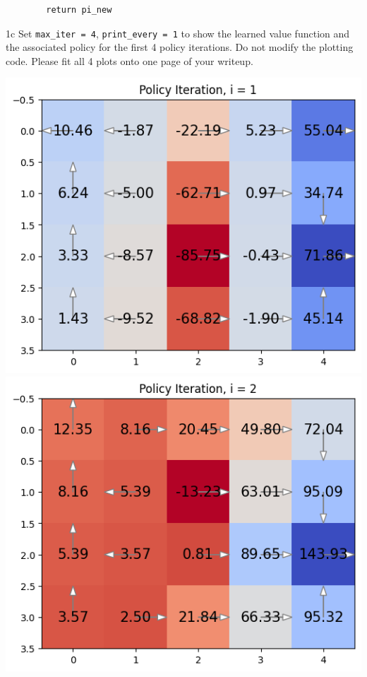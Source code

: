 \documentclass[expanded]{lkx_pset}
\begin{document}
\begin{solution}
\begin{verbatim}
    	return pi_new
	\end{verbatim}

	\newpage
	\begin{part}{1c}
		Set \texttt{max\_iter = 4}, \texttt{print\_every = 1} to show the learned value function and the associated policy for the first 4 policy iterations. Do not modify the plotting code. Please fit all 4 plots onto one page of your writeup.
	\end{part}

	\begin{center}
		\includegraphics[scale=0.5]{figures/1c-1.png}
		\includegraphics[scale=0.5]{figures/1c-2.png}

\end{center}
\end{solution}
\end{document}
